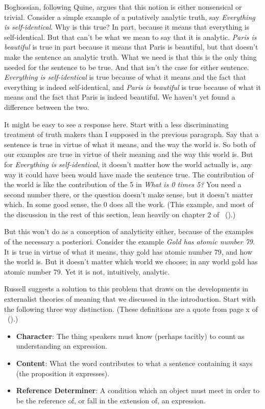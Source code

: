 \documentclass[
  11pt,
  letterpaper,
  DIV=11,
  numbers=noendperiod,
  twoside]{scrartcl}
\providecommand{\tightlist}{%
  \setlength{\itemsep}{0pt}\setlength{\parskip}{0pt}}
\begin{document}
Boghossian, following Quine, argues that this notion is either
nonsensical or trivial. Consider a simple example of a putatively
analytic truth, say \emph{Everything is self-identical}. Why is this
true? In part, because it means that everything is self-identical. But
that can't be what we mean to say that it is analytic. \emph{Paris is
beautiful} is true in part because it means that Paris is beautiful, but
that doesn't make the sentence an analytic truth. What we need is that
this is the only thing needed for the sentence to be true. And that
isn't the case for either sentence. \emph{Everything is self-identical}
is true because of what it means and the fact that everything is indeed
self-identical, and \emph{Paris is beautiful} is true because of what it
means and the fact that Paris is indeed beautiful. We haven't yet found
a difference between the two.

It might be easy to see a response here. Start with a less
discriminating treatment of truth makers than I supposed in the previous
paragraph. Say that a sentence is true in virtue of what it means, and
the way the world is. So both of our examples are true in virtue of
their meaning and the way this world is. But for \emph{Everything is
self-identical}, it doesn't matter how the world actually is, any way it
could have been would have made the sentence true. The contribution of
the world is like the contribution of the 5 in \emph{What is 0 times 5?}
You need a second number there, or the question doesn't make sense, but
it doesn't matter which. In some good sense, the 0 does all the work.
(This example, and most of the discussion in the rest of this section,
lean heavily on chapter 2 of ~().)

But this won't do as a conception of analyticity either, because of the
examples of the necessary a posteriori. Consider the example \emph{Gold
has atomic number 79}. It is true in virtue of what it means, thay gold
has atomic number 79, and how the world is. But it doesn't matter which
world we choose; in any world gold has atomic number 79. Yet it is not,
intuitively, analytic.

Russell suggests a solution to this problem that draws on the
developments in externalist theories of meaning that we discussed in the
introduction. Start with the following three way distinction. (These
definitions are a quote from page x of
~().)

\begin{itemize}
\tightlist
\item
  \textbf{Character}: The thing speakers must know (perhaps tacitly) to
  count as understanding an expression.
\item
  \textbf{Content}: What the word contributes to what a sentence
  containing it says (the proposition it expresses).
\item
  \textbf{Reference Determiner}: A condition which an object must meet
  in order to be the reference of, or fall in the extension of, an
  expression.
\end{itemize}
\end{document}
